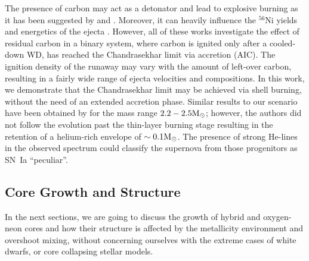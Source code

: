 \documentclass[../../main/thesis_msc.tex]{subfiles}
\begin{document}
    The presence of carbon may act as a detonator and lead to explosive burning as it has been suggested by \cite[][hereafter SR19, and WB07 respectively]{Schwab:2018cnb, Waldman2007} and \cite{Dominguez1993, Garcia1997, Gutierrez2005}. Moreover, it can heavily influence the $^{56}$Ni yields and energetics of the ejecta \citep{Willcox2016}. However, all of these works investigate the effect of residual carbon in a binary system, where carbon is ignited only after a cooled-down WD, has reached the Chandrasekhar limit via accretion (AIC). The ignition density of the runaway may vary with the amount of left-over carbon, resulting in a fairly wide range of ejecta velocities and compositions. In this work, we demonstrate that the Chandrasekhar limit may be achieved via shell burning, without the need of an extended accretion phase. Similar results to our scenario have been obtained by \cite{waldman2008} for the mass range $2.2 - 2.5 \rm M_{\odot}$; however, the authors did not follow the evolution past the thin-layer burning stage resulting in the retention of a helium-rich envelope of $\sim 0.1 \rm M_{\odot}$. The presence of strong He-lines in the observed spectrum could classify the supernova from those progenitors as SN\, Ia ``peculiar''.
    
    
    
    \subsection{Core Growth and Structure} \label{sec:coreGrowth}
    
    In the next sections, we are going to discuss the growth of hybrid and oxygen-neon cores and how their structure is affected by the metallicity environment and overshoot mixing, without concerning ourselves with the extreme cases of white dwarfs, or core collapsing stellar models.
    
\end{document}
